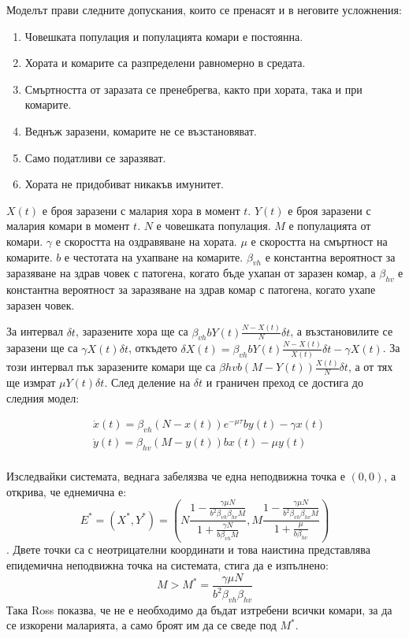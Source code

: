Моделът прави следните допускания, които се пренасят и в неговите усложнения:
\begin{enumerate}
  \item Човешката популация и популацията комари е постоянна.
  \item Хората и комарите са разпределени равномерно в средата.
  \item Смъртността от заразата се пренебрегва, както при хората, така и при комарите.
  \item Веднъж заразени, комарите не се възстановяват.
  \item Само податливи се заразяват.
  \item Хората не придобиват никакъв имунитет.
\end{enumerate}

$X(t)$ е броя заразени с малария хора в момент $t$.
$Y(t)$ е броя заразени с малария комари в момент $t$.
$N$ е човешката популация.
$M$ е популацията от комари.
$\gamma$ е скоростта на оздравяване на хората.
$\mu$ е скоростта на смъртност на комарите.
$b$ е честотата на ухапване на комарите.
$\beta_{vh}$ е константна вероятност за заразяване на здрав човек с патогена, когато бъде ухапан от заразен комар, а $\beta_{hv}$ е константна вероятност за заразяване на здрав комар с патогена, когато ухапе заразен човек.

За интервал $\delta t$, заразените хора ще са $\beta_{vh} b Y(t) \frac{N-X(t)}{N} \delta t$, а възстановилите се заразени ще са $\gamma X(t) \delta t$, откъдето $\delta X(t) = \beta_{vh} b Y(t) \frac{N-X(t)}{X(t)} \delta t - \gamma X(t)$.
За този интервал пък заразените комари ще са $\beta{hv} b (M - Y(t)) \frac{X(t)}{N} \delta t$, а от тях ще измрат $\mu Y(t) \delta t$. След деление на $\delta t$ и граничен преход се достига до следния модел:

\begin{equation}
  \label{eq:BasicProblem}
  \begin{split}
    &\dot{x}(t) = \beta_{vh} (N-x(t)) e^{-\mu \tau} b y(t) - \gamma x(t) \\
    &\dot{y}(t) = \beta_{hv} (M-y(t)) b x(t) - \mu y(t) \\
  \end{split}
\end{equation}

Изследвайки системата, веднага забелязва че една неподвижна точка е $(0,0)$, а открива, че еднемична е:
\begin{equation*}
  E^* = (X^*, Y^*) = \left(N \frac{1 - \frac{\gamma \mu N}{b^2 \beta_{vh} \beta_{hv} M}}{1 + \frac{\gamma N}{b \beta_{vh} M}}, M \frac{1 - \frac{\gamma \mu N}{b^2 \beta_{vh} \beta_{hv} M}}{1 + \frac{\mu}{b \beta_{hv}}}\right)
\end{equation*}.
Двете точки са с неотрицателни координати и това наистина представлява епидемична неподвижна точка на системата, стига да е изпълнено:
\begin{equation}
  \label{eq:RossM}
  M > M^* = \frac{\gamma \mu N}{b^2 \beta_{vh} \beta_{hv}}
\end{equation}
Така Ross показва, че не е необходимо да бъдат изтребени всички комари, за да се изкорени маларията, а само броят им да се сведе под $M^*$.


